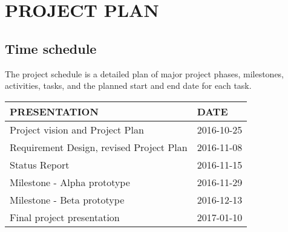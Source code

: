 \section{PROJECT PLAN}
\subsection{Time schedule}
The project schedule is a detailed plan of major project phases, milestones, activities, tasks, and the planned start and end date for each task.
\begin{center}
	\begin{tabular} { | m{10cm} | m{3cm} | }
		\hline
		\textbf{PRESENTATION} & \textbf{DATE}\\
		\hline
		Project vision and Project Plan & 2016-10-25\\
		\hline
		Requirement Design, revised Project Plan & 2016-11-08\\
		\hline
		Status Report & 2016-11-15\\
		\hline
		Milestone - Alpha prototype & 2016-11-29\\
		\hline
		Milestone - Beta prototype & 2016-12-13\\
		\hline
		Final project presentation & 2017-01-10\\
		\hline
	\end{tabular}
\end{center}